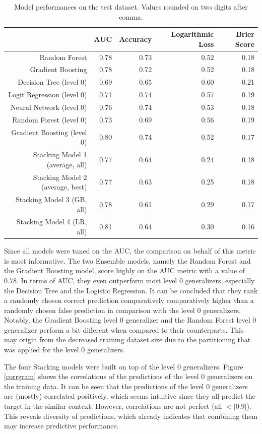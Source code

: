 \documentclass[12pt]{article}
\begin{document}
\begin{table}[ht]
\centering
\begin{tabular}{rrrrr}
  \hline
 & AUC & Accuracy & Logarithmic Loss & Brier Score \\ 
  \hline
Random Forest & 0.78 & 0.73 & 0.52 & 0.18 \\ 
  Gradient Boosting & 0.78 & 0.72 & 0.52 & 0.18 \\
\hline 
  Decision Tree (level 0) & 0.69 & 0.65 & 0.60 & 0.21 \\ 
  Logit Regression (level 0) & 0.71 & 0.74 & 0.57 & 0.19 \\ 
  Neural Network (level 0) & 0.76 & 0.74 & 0.53 & 0.18 \\ 
  Random Forest (level 0) & 0.73 & 0.69 & 0.56 & 0.19 \\ 
  Gradient Boosting (level 0) & 0.80 & 0.74 & 0.52 & 0.17 \\ 
\hline
  Stacking Model 1 (average, all) & 0.77 & 0.64 & 0.24 & 0.18 \\ 
  Stacking Model 2 (average, best) & 0.77 & 0.63 & 0.25 & 0.18 \\ 
  Stacking Model 3 (GB, all) & 0.78 & 0.61 & 0.29 & 0.17 \\ 
  Stacking Model 4 (LR, all) & 0.81 & 0.64 & 0.30 & 0.16 \\ 
   \hline
\end{tabular}
\caption[Model performances on the test dataset]{Model performances on the test dataset. Values rounded on two digits after comma.}\label{eval}
\end{table}

Since all models were tuned on the AUC, the comparison on behalf of this metric is most informative. The two Ensemble models, namely the Random Forest and the Gradient Boosting model, score highly on the AUC metric with a value of $0.78$. In terms of AUC, they even outperform most level 0 generalizers, especially the Decision Tree and the Logistic Regression. It can be concluded that they rank a randomly chosen correct prediction comparatively comparatively higher than a randomly chosen false prediction in comparison with the level 0 generalizers. Notably, the Gradient Boosting level 0 generalizer and the Random Forest level 0 generalizer perform a bit different when compared to their counterparts. This may origin from the decreased training dataset size due to the partitioning that was applied for the level 0 generalizers. 

The four Stacking models were built on top of the level 0 generalizers. Figure \ref{corrgram} shows the correlations of the predictions of the level 0 generalizers on the training data. It can be seen that the predictions of the level 0 generalizers are (mostly) correlated positively, which seems intuitive since they all predict the target in the similar context. However, correlations are not perfect (all $<|0.9|$). This reveals diversity of predictions, which already indicates that combining them may increase predictive performance.
\end{document}
